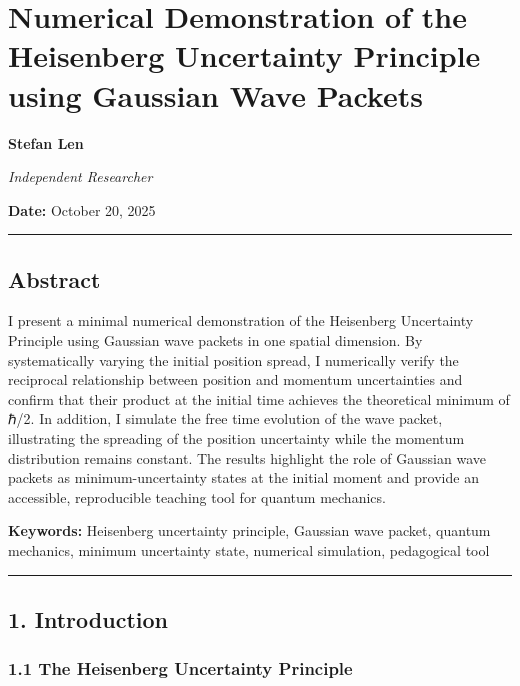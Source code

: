 \documentclass[
]{article}
\author{}
\date{}
\begin{document}
\section{Numerical Demonstration of the Heisenberg Uncertainty Principle
using Gaussian Wave
Packets}\label{numerical-demonstration-of-the-heisenberg-uncertainty-principle-using-gaussian-wave-packets}

\textbf{Stefan Len}

\emph{Independent Researcher}

\textbf{Date:} October 20, 2025

\begin{center}\rule{0.5\linewidth}{0.5pt}\end{center}

\subsection{Abstract}\label{abstract}

I present a minimal numerical demonstration of the Heisenberg
Uncertainty Principle using Gaussian wave packets in one spatial
dimension. By systematically varying the initial position spread, I
numerically verify the reciprocal relationship between position and
momentum uncertainties and confirm that their product at the initial
time achieves the theoretical minimum of ℏ/2. In addition, I simulate
the free time evolution of the wave packet, illustrating the spreading
of the position uncertainty while the momentum distribution remains
constant. The results highlight the role of Gaussian wave packets as
minimum-uncertainty states at the initial moment and provide an
accessible, reproducible teaching tool for quantum mechanics.

\textbf{Keywords:} Heisenberg uncertainty principle, Gaussian wave
packet, quantum mechanics, minimum uncertainty state, numerical
simulation, pedagogical tool

\begin{center}\rule{0.5\linewidth}{0.5pt}\end{center}

\subsection{1. Introduction}\label{introduction}

\subsubsection{1.1 The Heisenberg Uncertainty
Principle}\label{the-heisenberg-uncertainty-principle}
\end{document}
